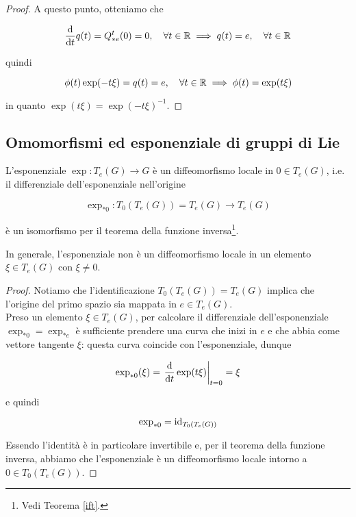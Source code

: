 \begin{proof}
	A questo punto, otteniamo che
	
	\begin{equation}
		\dv{t} q(t) = Q^{t}_{*e} (0) = 0 \qcomma \forall t \in \R \implies q(t) = e \qcomma \forall t \in \R
	\end{equation}

	quindi
	
	\begin{equation}
		\phi(t) \exp(-t \xi) = q(t) = e \qcomma \forall t \in \R \implies \phi(t) = \exp(t \xi)
	\end{equation}

	in quanto $ \exp(t \xi) = \exp(-t \xi)^{-1} $.
\end{proof}

\subsection{Omomorfismi ed esponenziale di gruppi di Lie}

\begin{definition}
	L'esponenziale $ \exp : T_{e}(G) \to G $ è un diffeomorfismo locale in $ 0 \in T_{e}(G) $, i.e. il differenziale dell'esponenziale nell'origine
	
	\begin{equation}
		\exp_{*0} : T_{0}(T_{e}(G)) = T_{e}(G) \to T_{e}(G)
	\end{equation}

	è un isomorfismo per il teorema della funzione inversa\footnote{%
		Vedi Teorema \ref{ift}.%
	}.
\end{definition}

\begin{remark}
	In generale, l'esponenziale non è un diffeomorfismo locale in un elemento $ \xi \in T_{e}(G) $ con $ \xi \neq 0 $.
\end{remark}

\begin{proof}
	Notiamo che l'identificazione $ T_{0}(T_{e}(G)) = T_{e}(G) $ implica che l'origine del primo spazio sia mappata in $ e \in T_{e}(G) $.\\
	Preso un elemento $ \xi \in T_{e}(G) $, per calcolare il differenziale dell'esponenziale $ \exp_{*0} = \exp_{*e} $ è sufficiente prendere una curva che inizi in $ e $ e che abbia come vettore tangente $ \xi $: questa curva coincide con l'esponenziale, dunque
	
	\begin{equation}
		\exp_{*0} (\xi) =  \eval{ \dv{t} \exp(t \xi) }_{t=0} = \xi
	\end{equation}

	e quindi
	
	\begin{equation}
		\exp_{*0} = \operatorname{id}_{T_{0}(T_{e}(G))}
	\end{equation}

	Essendo l'identità è in particolare invertibile e, per il teorema della funzione inversa, abbiamo che l'esponenziale è un diffeomorfismo locale intorno a $ 0 \in T_{0}(T_{e}(G)) $.
\end{proof}

